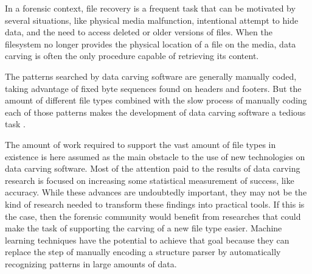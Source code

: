     

In a forensic context, file recovery is a frequent task that can be motivated by several situations, like physical media malfunction, intentional attempt to hide data, and the need to access deleted or older versions of files. When the filesystem no longer provides the physical location of a file on the media, data carving is often the only procedure capable of retrieving its content.


The patterns searched by data carving software are generally manually coded, taking advantage of fixed byte sequences found on headers and footers. But the amount of different file types combined with the slow process of manually coding each of those patterns makes the development of data carving software a tedious task \cite{mcdaniel_content_2003}.



The amount of work required to support the vast amount of file types in existence is here assumed as the main obstacle to the use of new technologies on data carving software. Most of the attention paid to the results of data carving research is focused on increasing some statistical measurement of success, like accuracy. While these advances are undoubtedly important, they may not be the kind of research needed to transform these findings into practical tools. If this is the case, then the forensic community would benefit from researches that could make the task of supporting the carving of a new file type easier. Machine learning techniques have the potential to achieve that goal because they can replace the step of manually encoding a structure parser by automatically recognizing patterns in large amounts of data.


